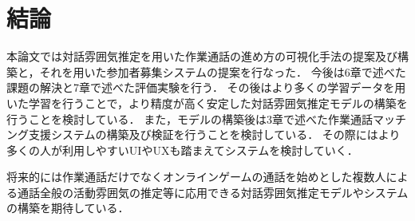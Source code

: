 \chapter{結論\label{sec:conclusion}}
\thispagestyle{plain}

本論文では対話雰囲気推定を用いた作業通話の進め方の可視化手法の提案及び構築と，それを用いた参加者募集システムの提案を行なった．
今後は6章で述べた課題の解決と7章で述べた評価実験を行う．
その後はより多くの学習データを用いた学習を行うことで，より精度が高く安定した対話雰囲気推定モデルの構築を行うことを検討している．
また，モデルの構築後は3章で述べた作業通話マッチング支援システムの構築及び検証を行うことを検討している．
その際にはより多くの人が利用しやすいUIやUXも踏まえてシステムを検討していく．

将来的には作業通話だけでなくオンラインゲームの通話を始めとした複数人による通話全般の活動雰囲気の推定等に応用できる対話雰囲気推定モデルやシステムの構築を期待している．
